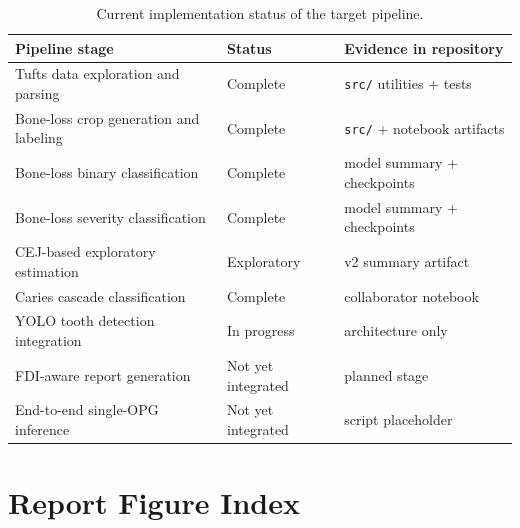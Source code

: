 \begin{table}[htbp]
  \centering
  \caption{Current implementation status of the target pipeline.}
  \label{tab:arch-status}
  \begin{tabular}{@{}lll@{}}
    \toprule
    Pipeline stage & Status & Evidence in repository \\
    \midrule
    Tufts data exploration and parsing & Complete & \texttt{src/} utilities + tests \\
    Bone-loss crop generation and labeling & Complete & \texttt{src/} + notebook artifacts \\
    Bone-loss binary classification & Complete & model summary + checkpoints \\
    Bone-loss severity classification & Complete & model summary + checkpoints \\
    CEJ-based exploratory estimation & Exploratory & v2 summary artifact \\
    Caries cascade classification & Complete & collaborator notebook \\
    YOLO tooth detection integration & In progress & architecture only \\
    FDI-aware report generation & Not yet integrated & planned stage \\
    End-to-end single-OPG inference & Not yet integrated & script placeholder \\
    \bottomrule
  \end{tabular}
\end{table}

\section{Report Figure Index}
\label{sec:arch-figure-index}

